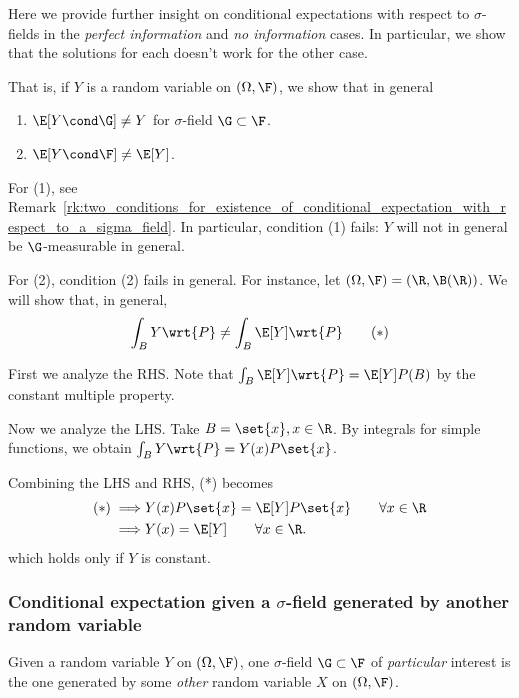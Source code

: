 \documentclass{article} %
\begin{document}
\begin{remark}
Here we provide further insight on conditional expectations with respect to $\sigma$-fields in the \textit{perfect information} and \textit{no information} cases.  In particular, we show that the solutions for each doesn't work for the other case. 

That is, if $Y$ is a random variable on $(\Omega, \F)$, we show that in general
\begin{enumerate}
	\item $\E[Y \cond \G] \neq Y$ for $\sigma$-field $\G \subset \F$. 
	\item $\E[Y \cond \F] \neq \E[Y]$.
\end{enumerate}
For (1), see Remark~\ref{rk:two_conditions_for_existence_of_conditional_expectation_with_respect_to_a_sigma_field}.  In particular, condition (1) fails: $Y$ will not in general be $\G$-measurable in general.

For (2), condition (2) fails in general.  For instance, let $(\Omega, \F)=(\R, \B(\R))$.  We will show that, in general,
\[ \int_B Y \wrt{P} \neq \int_B \E[Y] \wrt{P} \quad \quad (*) \]  

First we analyze the RHS.  Note that $\int_B \E[Y] \wrt{P} = \E[Y] P(B)$ by the constant multiple property. 

Now we analyze the LHS. Take $B=\set{x}, x \in \R$.  By integrals for simple functions, we obtain $\int_B Y \wrt{P} = Y(x) P\set{x}$.

Combining the LHS and RHS, (*) becomes 
\begin{align*}
(*) \implies & Y(x) P\set{x} = \E[Y] P\set{x} \quad \quad \forall x \in \R \\
\implies  & Y(x)= \E[Y]  \quad \quad  \forall x \in \R.	
\end{align*}
which holds only if $Y$ is constant.

\end{remark}

\subsubsection{Conditional expectation given a $\sigma$-field generated by another random variable}  \label{sec:conditional_expectation_wrt_a_sigma_field_induced_by_another_random_variable}

Given a random variable $Y$ on $(\Omega, \F)$, one $\sigma$-field $\G \subset \F$ of \textit{particular} interest is the one generated by some \textit{other} random variable $X$ on $(\Omega, \F)$.
\end{document}
